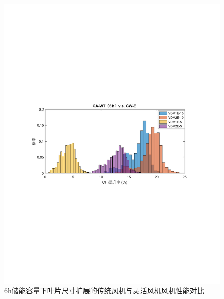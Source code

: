 \begin{figure}[H] %
  \centering
  \includegraphics[scale=0.75]{figures/Chap5-CA-WT-6h-VS-GW-E.pdf}
  \caption{6h储能容量下叶片尺寸扩展的传统风机与灵活风机风机性能对比}
  \label{fig:CA-WT-6h-VS-GW-E}
\end{figure}

